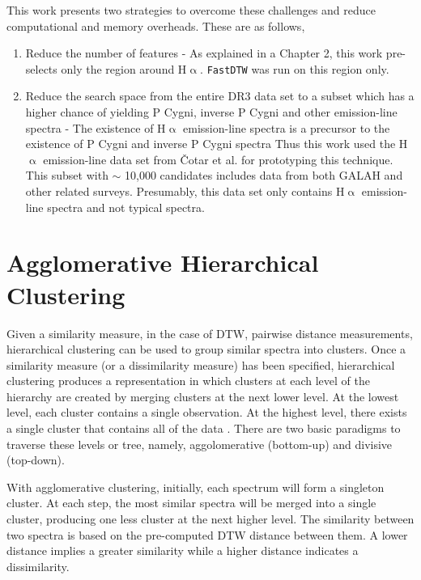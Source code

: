 This work presents two strategies to overcome these challenges and reduce computational and memory overheads. These are as follows,

\begin{enumerate}
    \item Reduce the number of features - As explained in a Chapter 2, this work pre-selects only the region around H$\upalpha$. \texttt{FastDTW} was run on this region only.
    \item Reduce the search space from the entire DR3 data set to a subset which has a higher chance of yielding P Cygni, inverse P Cygni and other emission-line spectra - The existence of H$\upalpha$ emission-line spectra is a precursor to the existence of P Cygni and inverse P Cygni spectra Thus this work used the H$\upalpha$ emission-line data set from Čotar et al.\cite{vcotar2021galah} for prototyping this technique. This subset with $\sim$ 10,000 candidates includes data from both GALAH and other related surveys. Presumably, this data set only contains H$\upalpha$ emission-line spectra and not typical spectra.
\end{enumerate}

\section{Agglomerative Hierarchical Clustering}

Given a similarity measure, in the case of DTW, pairwise distance measurements, hierarchical clustering can be used to group similar spectra into clusters. Once a similarity measure (or a dissimilarity measure) has been specified, hierarchical clustering produces a representation in which clusters at each level of the hierarchy are created by merging clusters at the next lower level. At the lowest level, each cluster contains a single observation. At the highest level, there exists a single cluster that contains all of the data \cite{hastie2009elements}. There are two basic paradigms to traverse these levels or tree, namely, aggolomerative (bottom-up) and divisive (top-down). 

With agglomerative clustering, initially, each spectrum will form a singleton cluster. At each step, the most similar spectra will be merged into a single cluster, producing one less cluster at the next higher level. The similarity between two spectra is based on the pre-computed DTW distance between them. A lower distance implies a greater similarity while a higher distance indicates a dissimilarity.  

